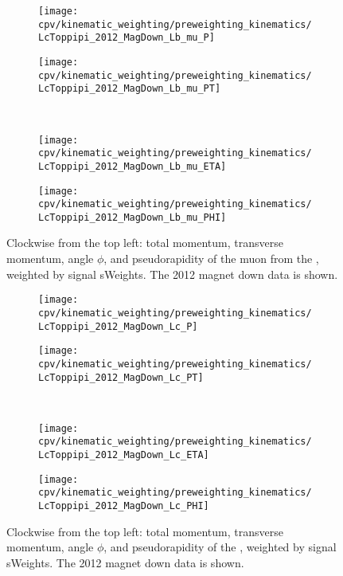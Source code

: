 \begin{figure}
  \begin{subfigure}[b]{0.4\textwidth}
    \texttt{[image: cpv/kinematic\_weighting/preweighting\_kinematics/LcToppipi\_2012\_MagDown\_Lb\_mu\_P]}
    \label{fig:cpv:kinematic_weighting:pre:Lb_mu:P}
  \end{subfigure}
  \begin{subfigure}[b]{0.4\textwidth}
    \texttt{[image: cpv/kinematic\_weighting/preweighting\_kinematics/LcToppipi\_2012\_MagDown\_Lb\_mu\_PT]}
    \label{fig:cpv:kinematic_weighting:pre:Lb_mu:PT}
  \end{subfigure}\\
  \begin{subfigure}[b]{0.4\textwidth}
    \texttt{[image: cpv/kinematic\_weighting/preweighting\_kinematics/LcToppipi\_2012\_MagDown\_Lb\_mu\_ETA]}
    \label{fig:cpv:kinematic_weighting:pre:Lb_mu:ETA}
  \end{subfigure}
  \begin{subfigure}[b]{0.4\textwidth}
    \texttt{[image: cpv/kinematic\_weighting/preweighting\_kinematics/LcToppipi\_2012\_MagDown\_Lb\_mu\_PHI]}
    \label{fig:cpv:kinematic_weighting:pre:Lb_mu:PHI}
  \end{subfigure}
  \caption{%
    Clockwise from the top left: total momentum, transverse momentum, angle 
    $\phi$, and pseudorapidity of the muon from the \PLambdab, weighted by 
    signal sWeights.
    The 2012 magnet down data is shown.
  }
  \label{fig:cpv:kinematic_weighting:pre:Lb_mu}
\end{figure}

\begin{figure}
  \begin{subfigure}[b]{0.4\textwidth}
    \texttt{[image: cpv/kinematic\_weighting/preweighting\_kinematics/LcToppipi\_2012\_MagDown\_Lc\_P]}
    \label{fig:cpv:kinematic_weighting:pre:Lc:P}
  \end{subfigure}
  \begin{subfigure}[b]{0.4\textwidth}
    \texttt{[image: cpv/kinematic\_weighting/preweighting\_kinematics/LcToppipi\_2012\_MagDown\_Lc\_PT]}
    \label{fig:cpv:kinematic_weighting:pre:Lc:PT}
  \end{subfigure}\\
  \begin{subfigure}[b]{0.4\textwidth}
    \texttt{[image: cpv/kinematic\_weighting/preweighting\_kinematics/LcToppipi\_2012\_MagDown\_Lc\_ETA]}
    \label{fig:cpv:kinematic_weighting:pre:Lc:ETA}
  \end{subfigure}
  \begin{subfigure}[b]{0.4\textwidth}
    \texttt{[image: cpv/kinematic\_weighting/preweighting\_kinematics/LcToppipi\_2012\_MagDown\_Lc\_PHI]}
    \label{fig:cpv:kinematic_weighting:pre:Lc:PHI}
  \end{subfigure}
  \caption{%
    Clockwise from the top left: total momentum, transverse momentum, angle 
    $\phi$, and pseudorapidity of the \PLambdac, weighted by signal sWeights.
    The 2012 magnet down data is shown.
  }
  \label{fig:cpv:kinematic_weighting:pre:Lc}
\end{figure}

